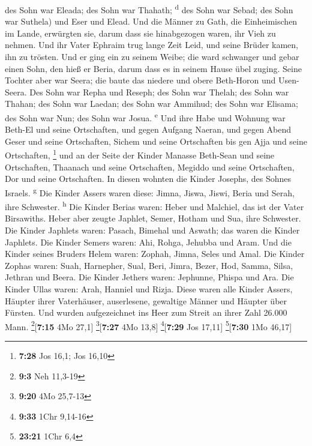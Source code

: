 des Sohn war Eleada; des Sohn war Thahath; \textsuperscript{d}
 des Sohn war Sebad; des Sohn war Suthela) und Eser und
Elead. Und die Männer zu Gath, die Einheimischen im Lande, erwürgten
sie, darum dass sie hinabgezogen waren, ihr Vieh zu nehmen.
 Und ihr Vater Ephraim trug lange Zeit Leid, und seine
Brüder kamen, ihn zu trösten.  Und er ging ein zu seinem
Weibe; die ward schwanger und gebar einen Sohn, den hieß er Beria, darum
dass es in seinem Hause übel zuging.  Seine Tochter aber
war Seera; die baute das niedere und obere Beth-Horon und Usen-Seera.
 Des Sohn war Repha und Reseph; des Sohn war Thelah; des
Sohn war Thahan;  des Sohn war Laedan; des Sohn war
Ammihud; des Sohn war Elisama;  des Sohn war Nun; des
Sohn war Josua. \textsuperscript{e}  Und ihre Habe und
Wohnung war Beth-El und seine Ortschaften, und gegen Aufgang Naeran, und
gegen Abend Geser und seine Ortschaften, Sichem und seine Ortschaften
bis gen Ajja und seine Ortschaften, \footnote{\textbf{7:28} Jos 16,1;
  Jos 16,10}  und an der Seite der Kinder Manasse
Beth-Sean und seine Ortschaften, Thaanach und seine Ortschaften, Megiddo
und seine Ortschaften, Dor und seine Ortschaften. In diesen wohnten die
Kinder Josephs, des Sohnes Israels. \textsuperscript{g} 
Die Kinder Assers waren diese: Jimna, Jiswa, Jiswi, Beria und Serah,
ihre Schwester. \textsuperscript{h}  Die Kinder Berias
waren: Heber und Malchiel, das ist der Vater Birsawiths. 
Heber aber zeugte Japhlet, Semer, Hotham und Sua, ihre Schwester.
 Die Kinder Japhlets waren: Pasach, Bimehal und Aswath;
das waren die Kinder Japhlets.  Die Kinder Semers waren:
Ahi, Rohga, Jehubba und Aram.  Und die Kinder seines
Bruders Helem waren: Zophah, Jimna, Seles und Amal.  Die
Kinder Zophas waren: Suah, Harnepher, Sual, Beri, Jimra, 
Bezer, Hod, Samma, Silsa, Jethran und Beera.  Die Kinder
Jethers waren: Jephunne, Phispa und Ara.  Die Kinder
Ullas waren: Arah, Hanniel und Rizja.  Diese waren alle
Kinder Assers, Häupter ihrer Vaterhäuser, auserlesene, gewaltige Männer
und Häupter über Fürsten. Und wurden aufgezeichnet ins Heer zum Streit
an ihrer Zahl 26.000 Mann. \footnote{\textbf{9:3} Neh 11,3-19}{[}\textbf{7:15}
4Mo 27,1{]} \footnote{\textbf{9:20} 4Mo 25,7-13}{[}\textbf{7:27} 4Mo
13,8{]} \footnote{\textbf{9:33} 1Chr 9,14-16}{[}\textbf{7:29} Jos
17,11{]} \footnote{\textbf{23:21} 1Chr 6,4}{[}\textbf{7:30} 1Mo 46,17{]}

